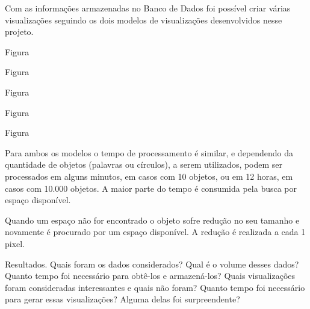 \documentclass[12pt]{article}
\begin{document}
Com as informações armazenadas no Banco de Dados foi possível criar várias visualizações seguindo os dois modelos de visualizações desenvolvidos nesse projeto.




Figura


Figura


Figura


Figura


Figura



Para ambos os modelos o tempo de processamento é similar, e dependendo da quantidade de objetos (palavras ou círculos), a serem utilizados, podem ser processados em alguns minutos, em casos com 10 objetos, ou em 12 horas, em casos com 10.000 objetos. A maior parte do tempo é consumida pela busca por espaço disponível. 

Quando um espaço não for encontrado o objeto sofre redução no seu tamanho e novamente é procurado por um espaço disponível. A redução é realizada a cada 1 pixel. 




Resultados.
Quais foram os dados considerados? Qual é o volume desses dados? Quanto tempo foi
necessário para obtê-los e armazená-los? Quais visualizações foram consideradas interessantes e quais não
foram? Quanto tempo foi necessário para gerar essas visualizações? Alguma delas foi surpreendente?



\begin{thebibliography}{2}

\end{thebibliography}
\end{document}
